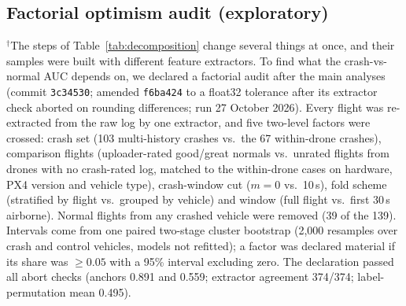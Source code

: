 \documentclass[preprint,12pt]{elsarticle}
\begin{document}
\subsection{Factorial optimism audit (exploratory)}
\label{sec:factorial}
$^\dagger$The steps of Table~\ref{tab:decomposition} change several things at once, and their samples were built with different feature extractors. To find what the crash-vs-normal AUC depends on, we declared a factorial audit after the main analyses (commit \texttt{3c34530}; amended \texttt{f6ba424} to a float32 tolerance after its extractor check aborted on rounding differences; run 27 October 2026). Every flight was re-extracted from the raw log by one extractor, and five two-level factors were crossed: crash set (103 multi-history crashes vs.\ the 67 within-drone crashes), comparison flights (uploader-rated good/great normals vs.\ unrated flights from drones with no crash-rated log, matched to the within-drone cases on hardware, PX4 version and vehicle type), crash-window cut ($m=0$ vs.\ 10\,s), fold scheme (stratified by flight vs.\ grouped by vehicle) and window (full flight vs.\ first 30\,s airborne). Normal flights from any crashed vehicle were removed (39 of the 139). Intervals come from one paired two-stage cluster bootstrap (2,000 resamples over crash and control vehicles, models not refitted); a factor was declared material if its share was $\ge 0.05$ with a 95\% interval excluding zero. The declaration passed all abort checks (anchors 0.891 and 0.559; extractor agreement 374/374; label-permutation mean 0.495).
\end{document}
